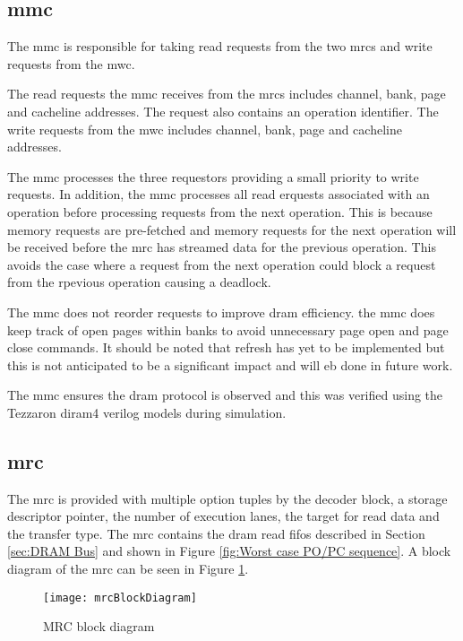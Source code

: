 \subsection{\Acf{mmc}}
\label{sec:MMC}

The \ac{mmc} is responsible for taking read requests from the two \acp{mrc} and write requests from the \ac{mwc}.

The read requests the \ac{mmc} receives from the \acp{mrc} includes channel, bank, page and cacheline addresses. 
The request also contains an operation identifier.
The write requests from the \ac{mwc} includes channel, bank, page and cacheline addresses. 

The \ac{mmc} processes the three requestors providing a small priority to write requests.
In addition, the \ac{mmc} processes all read erquests associated with an operation before processing requests from the next operation.
This is because memory requests are pre-fetched and memory requests for the next operation will be received before the \ac{mrc} has streamed data for the previous operation.
This avoids the case where a request from the next operation could block a request from the rpevious operation causing a deadlock.

The \ac{mmc} does not reorder requests to improve \ac{dram} efficiency. 
the \ac{mmc} does keep track of open pages within banks to avoid unnecessary page open and page close commands.
It should be noted that refresh has yet to be implemented but this is not anticipated to be a significant impact and will eb done in future work.

The \ac{mmc} ensures the \ac{dram} protocol is observed and this was verified using the Tezzaron \ac{diram4} verilog models during simulation.


\subsection{\Acf{mrc}}
\label{sec:MRC}

The \ac{mrc} is provided with multiple option tuples by the decoder block, a storage descriptor pointer, the number of execution lanes, the target for read data and the transfer type.
The \ac{mrc} contains the \ac{dram} read \acp{fifo} described in Section \ref{sec:DRAM Bus} and shown in Figure \ref{fig:Worst case PO/PC sequence}.
A block diagram of the \ac{mrc} can be seen in Figure \ref{fig:MRC block diagram}.
\begin{figure}[h]
\centering
\captionsetup{justification=centering}
\captionsetup{width=.9\linewidth}
\centerline{
\mbox{\texttt{[image: mrcBlockDiagram]}}
}
\center\caption{MRC block diagram}
\label{fig:MRC block diagram}
\end{figure}

